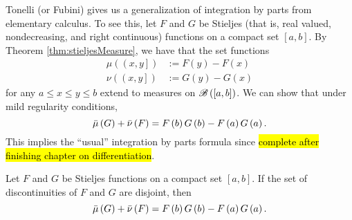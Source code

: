 Tonelli (or Fubini) gives us a generalization of integration by parts
from elementary calculus. To see this, let $F$ and $G$ be Stieljes
(that is, real valued, nondecreasing, and right continuous) functions
on a compact set $\left[a,b\right].$ By Theorem \ref{thm:stieljesMeasure},
we have that the set functions 
\begin{align*}
\mu\left(\left(x,y\right]\right) & :=F\left(y\right)-F\left(x\right)\\
\nu\left(\left(x,y\right]\right) & :=G\left(y\right)-G\left(x\right)
\end{align*}
for any $a\leq x\leq y\leq b$ extend to measures on $\mathscr{B}\left(\left[a,b\right]\right)$.
We can show that under mild regularity conditions, 
\[
\bar{\mu}\left(G\right)+\bar{\nu}\left(F\right)=F\left(b\right)G\left(b\right)-F\left(a\right)G\left(a\right).
\]
This implies the ``usual'' integration by parts formula since \hl{complete after finishing chapter on differentiation}.
\begin{thm}
\label{thm:generalizedIntegrationByParts}Let $F$ and $G$ be Stieljes
functions on a compact set $\left[a,b\right]$. If the set of discontinuities
of $F$ and $G$ are disjoint, then
\[
\bar{\mu}\left(G\right)+\bar{\nu}\left(F\right)=F\left(b\right)G\left(b\right)-F\left(a\right)G\left(a\right).
\]
\end{thm}

